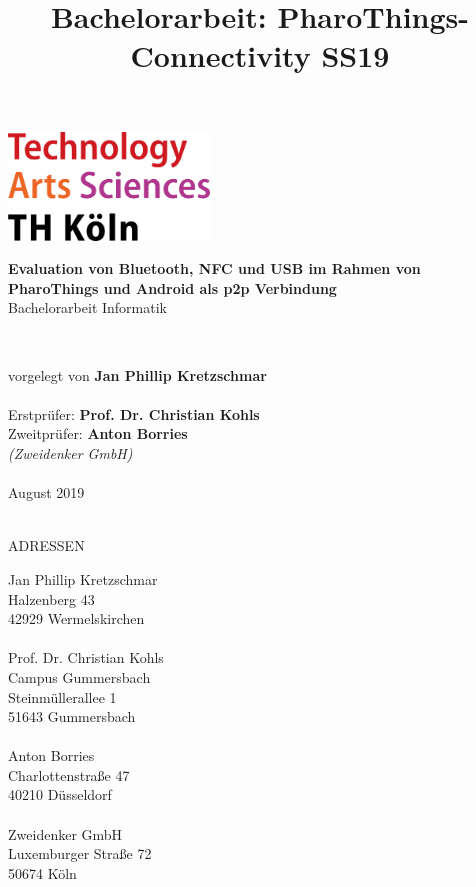 

\title{Bachelorarbeit: PharoThings-Connectivity SS19}

	\begin{titlepage}
    \includegraphics[width=0.4\textwidth]{../latex-ai-project/th_logo.png}
    ~\\[2.5cm]
    \begin{center}
    \textbf{\huge Evaluation von Bluetooth, NFC und USB im Rahmen von PharoThings und Android als p2p Verbindung}\\[0.5cm]
    {\Large Bachelorarbeit Informatik}
    \vfill
    \end{center}
    ~\\[2.0cm]
    \begin{flushright}
    {\large vorgelegt von {\bf Jan Phillip Kretzschmar}}\\[0.1cm]
    ~\\[1.5cm]
    {\large Erstprüfer: {\bf Prof. Dr. Christian Kohls}}
    ~\\[0.75cm]
    {\large Zweitprüfer: {\bf Anton Borries}}\\[0.1cm]
    {\large {\it (Zweidenker GmbH)}}\\[0.1cm]

	~\\[1.5cm]
    {\large August 2019}
	\end{flushright}
	\end{titlepage}
	\pagebreak
	\begin{titlepage}
	~\\[7.5cm]
    {\large ADRESSEN}
	~\\[1.0cm]
	\begin{flushright}
    {\large Jan Phillip Kretzschmar}\\[0.1cm]
    {\large Halzenberg 43}\\[0.1cm]
    {\large 42929 Wermelskirchen}\\[0.1cm]
    ~\\[1.0cm]
    {\large Prof. Dr. Christian Kohls}\\[0.1cm]
    {\large Campus Gummersbach}\\[0.1cm]
    {\large Steinmüllerallee 1}\\[0.1cm]
    {\large 51643 Gummersbach}\\[0.1cm]
    ~\\[1.0cm]
    {\large Anton Borries}\\[0.1cm]
    {\large Charlottenstraße 47}\\[0.1cm]
    {\large 40210 Düsseldorf}\\[0.1cm]
    ~\\[1.0cm]
    {\large Zweidenker GmbH}\\[0.1cm]
    {\large Luxemburger Straße 72}\\[0.1cm]
    {\large 50674 Köln}\\[0.1cm]
	 \end{flushright}
    \end{titlepage}
